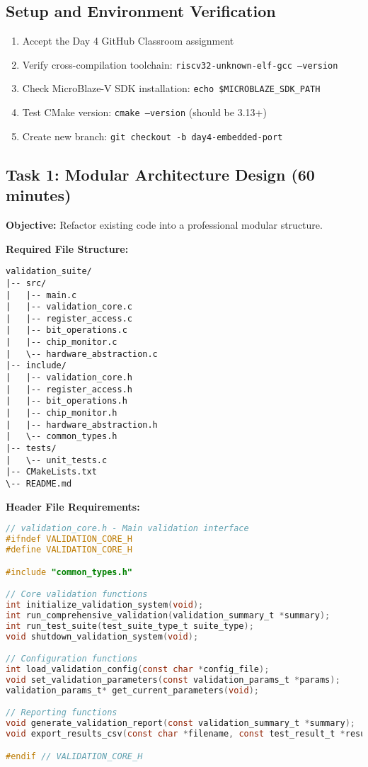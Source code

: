 \documentclass[11pt,a4paper]{article}
\begin{document}
\subsection{Setup and Environment Verification}
\begin{enumerate}
    \item Accept the Day 4 GitHub Classroom assignment
    \item Verify cross-compilation toolchain: \texttt{riscv32-unknown-elf-gcc --version}
    \item Check MicroBlaze-V SDK installation: \texttt{echo \$MICROBLAZE\_SDK\_PATH}
    \item Test CMake version: \texttt{cmake --version} (should be 3.13+)
    \item Create new branch: \texttt{git checkout -b day4-embedded-port}
\end{enumerate}

\subsection{Task 1: Modular Architecture Design (60 minutes)}

\textbf{Objective:} Refactor existing code into a professional modular structure.

\textbf{Required File Structure:}
\begin{verbatim}
validation_suite/
|-- src/
|   |-- main.c
|   |-- validation_core.c
|   |-- register_access.c
|   |-- bit_operations.c
|   |-- chip_monitor.c
|   \-- hardware_abstraction.c
|-- include/
|   |-- validation_core.h
|   |-- register_access.h
|   |-- bit_operations.h
|   |-- chip_monitor.h
|   |-- hardware_abstraction.h
|   \-- common_types.h
|-- tests/
|   \-- unit_tests.c
|-- CMakeLists.txt
\-- README.md
\end{verbatim}

\textbf{Header File Requirements:}
\begin{lstlisting}[language=C]
// validation_core.h - Main validation interface
#ifndef VALIDATION_CORE_H
#define VALIDATION_CORE_H

#include "common_types.h"

// Core validation functions
int initialize_validation_system(void);
int run_comprehensive_validation(validation_summary_t *summary);
int run_test_suite(test_suite_type_t suite_type);
void shutdown_validation_system(void);

// Configuration functions
int load_validation_config(const char *config_file);
void set_validation_parameters(const validation_params_t *params);
validation_params_t* get_current_parameters(void);

// Reporting functions
void generate_validation_report(const validation_summary_t *summary);
void export_results_csv(const char *filename, const test_result_t *results, int count);

#endif // VALIDATION_CORE_H
\end{lstlisting}
\end{document}
